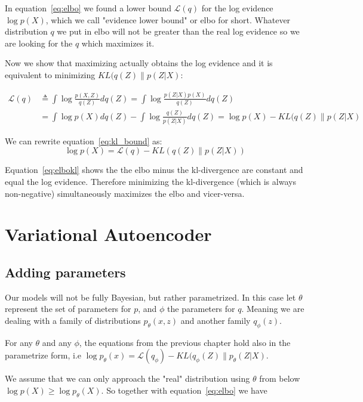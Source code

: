\documentclass[11pt, a4paper]{report}
\theoremstyle{plain}
\theoremstyle{definition}
\theoremstyle{remark}
\begin{document}
In equation~\ref{eq:elbo} we found a lower bound $\mathcal{L}(q)$ for the log
evidence $\log p(X)$, which we call "evidence lower bound" or elbo for short.
Whatever distribution $q$ we put in elbo will not be
greater than the real log evidence so we are looking for the $q$ which
maximizes it.

Now we show that maximizing actually obtains the log evidence and it is
equivalent to minimizing $KL(q(Z) \| p(Z|X)$:

\begin{equation}\label{eq:kl_bound}
\begin{aligned}
\mathcal{L}(q) &\triangleq \int \log \frac{p(X,Z)}{q(Z)} d q(Z)
= \int \log \frac{p(Z|X)p(X)}{q(Z)} d q(Z) \\
&= \int \log p(X) dq(Z) - \int \log \frac{q(Z)}{p(Z|X)} dq(Z) 
= \log p(X) - KL(q(Z) \| p(Z|X)
\end{aligned}
\end{equation}

We can rewrite equation~\ref{eq:kl_bound} as:
\begin{equation}\label{eq:elbokl}
\log p(X) = \mathcal{L}(q) - KL(q(Z) \| p(Z|X))
\end{equation}

Equation~\ref{eq:elbokl} shows the the elbo minus the kl-divergence are constant
and equal the log evidence. Therefore minimizing the kl-divergence (which is
always non-negative) simultaneously maximizes the elbo and vicer-versa.

\section{Variational Autoencoder}
\subsection{Adding parameters}

Our models will not be fully Bayesian, but rather parametrized.
In this case let $\theta$ represent the set of parameters for $p$, and $\phi$
the parameters for $q$. Meaning we are dealing with a family of distributions
$p_{\theta}(x,z)$ and another family $q_{\phi}(z)$.

For any $\theta$ and any $\phi$, the equations from the previous chapter hold
also in the parametrize form, i.e $\log p_{\theta}(x) = \mathcal{L}(q_{\phi}) -
KL(q_{\phi}(Z) \| p_{\theta}(Z|X)$.

We assume that we can only approach the "real" distribution using
$\theta$ from below $\log p(X) \geq \log p_{\theta}(X)$.
So together with equation~\ref{eq:elbo} we have
\end{document}
